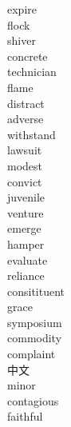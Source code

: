 \documentclass[a4paper, 10pt]{ctexart}
\begin{document}
\begin{multicols*}{2}
\begin{description}
\item[expire]

\item[flock]

\item[shiver]

\item[concrete]

\item[technician]

\item[flame]

\item[distract]

\item[adverse]

\item[withstand]

\item[lawsuit]

\item[modest]

\item[convict]

\item[juvenile]

\item[venture]

\item[emerge]

\item[hamper]

\item[evaluate]

\item[reliance]

\item[consitituent]

\item[grace]

\item[symposium]

\item[commodity]

\item[complaint]

\item[中文]

\item[minor]

\item[contagious]

\item[faithful]


\end{description}
\end{multicols*}
\end{document}
